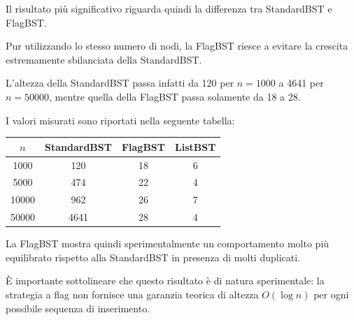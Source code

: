 \documentclass[a4paper,12pt]{article}
\begin{document}
Il risultato più significativo riguarda quindi la differenza tra StandardBST e FlagBST.

Pur utilizzando lo stesso numero di nodi, la FlagBST riesce a evitare la crescita estremamente sbilanciata della StandardBST.

L'altezza della StandardBST passa infatti da 120 per $n=1000$ a 4641 per $n=50000$, mentre quella della FlagBST passa solamente da 18 a 28.

I valori misurati sono riportati nella seguente tabella:

\begin{center}

\begin{tabular}{c|ccc}

$n$ & StandardBST & FlagBST & ListBST \\

\hline

1000 & 120 & 18 & 6 \\

5000 & 474 & 22 & 4 \\

10000 & 962 & 26 & 7 \\

50000 & 4641 & 28 & 4

\end{tabular}

\end{center}

La FlagBST mostra quindi sperimentalmente un comportamento molto più equilibrato rispetto alla StandardBST in presenza di molti duplicati.

È importante sottolineare che questo risultato è di natura sperimentale: la strategia a flag non fornisce una garanzia teorica di altezza $O(\log n)$ per ogni possibile sequenza di inserimento.
\end{document}
